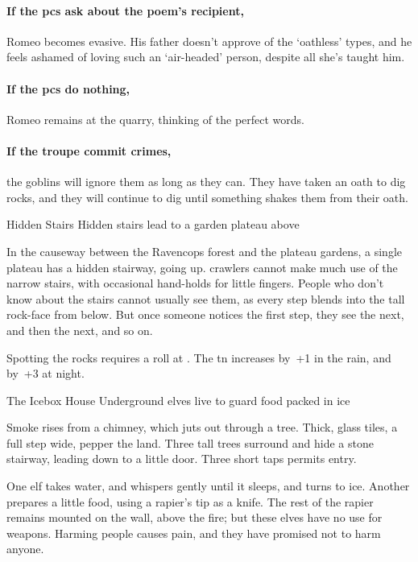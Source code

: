 \paragraph{If the \glspl{pc} ask about the poem's recipient,}
Romeo becomes evasive.
His father doesn't approve of the `oathless' types, and he feels ashamed of loving such an `air-headed' person, despite all she's taught him.

\paragraph{If the \glspl{pc} do nothing,}
Romeo remains at the quarry, thinking of the perfect words.

\paragraph{If the troupe commit crimes,}
the goblins will ignore them as long as they can.
They have taken an oath to dig rocks, and they will continue to dig until something shakes them from their oath.


{Hidden Stairs}%
{Hidden stairs lead to a garden plateau above}%


In the causeway between the Ravencops forest and the plateau gardens, a single plateau has a hidden stairway, going up.
\Glspl{crawler} cannot make much use of the narrow stairs, with occasional hand-holds for little fingers.
People who don't know about the stairs cannot usually see them, as every step blends into the tall rock-face from below.
But once someone notices the first step, they see the next, and then the next, and so on.

Spotting the rocks requires a  roll at \tn[12].
The \gls{tn} increases by~+1 in the rain, and by~+3 at night.


{The Icebox House}%
{Underground elves live to guard food packed in ice}%

Smoke rises from a chimney, which juts out through a tree.
Thick, glass tiles, a full step wide, pepper the land.
Three tall trees surround and hide a stone stairway, leading down to a little door.
Three short taps permits entry.

One elf takes water, and whispers gently until it sleeps, and turns to ice.
Another prepares a little food, using a rapier's tip as a knife.
The rest of the rapier remains mounted on the wall, above the fire; but these elves have no use for weapons.
Harming people causes pain, and they have promised not to harm anyone.

